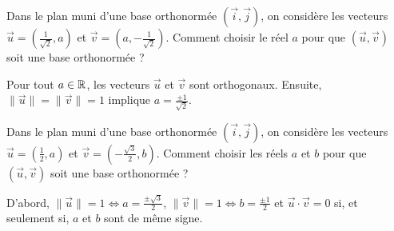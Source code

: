 \begin{question}

Dans le plan muni d'une base orthonormée $(\vec{i},\vec{j})$, on considère les vecteurs $\displaystyle \vec{u}=\left(\frac{1}{\sqrt{2}},a\right)$ et $\displaystyle \vec{v}=\left(a,-\frac{1}{\sqrt{2}}\right)$. Comment choisir le réel $a$ pour que $(\vec{u},\vec{v})$ soit une base orthonormée ?
\begin{answers}  
\end{answers}
\begin{explanations}
Pour tout $a\in \mathbb{R}$, les vecteurs $\vec{u}$ et $\vec{v}$ sont orthogonaux. Ensuite, $\|\vec{u}\|=\|\vec{v}\|=1$ implique $\displaystyle a=\frac{\pm 1}{\sqrt{2}}$.
\end{explanations}
\end{question}



\begin{question}

Dans le plan muni d'une base orthonormée $(\vec{i},\vec{j})$, on considère les vecteurs $\displaystyle \vec{u}=\left(\frac{1}{2},a\right)$ et $\displaystyle \vec{v}=\left(-\frac{\sqrt{3}}{2},b\right)$. Comment choisir les réels $a$ et $b$ pour que $(\vec{u},\vec{v})$ soit une base orthonormée ?
\begin{answers}  
\end{answers}
\begin{explanations}
D'abord, $\displaystyle \|\vec{u}\|=1\Leftrightarrow a=\frac{\pm \sqrt{3}}{2}$, $\displaystyle \|\vec{v}\|=1\Leftrightarrow b=\frac{\pm 1}{2}$ et $\vec{u}\cdot\vec{v}=0$ si, et seulement si, $a$ et $b$ sont de même signe.
\end{explanations}
\end{question}


